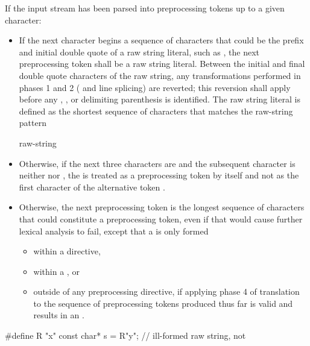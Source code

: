 \pnum
If the input stream has been parsed into preprocessing tokens up to a
given character:
\begin{itemize}
%
\item If the next character begins a sequence of characters that could be the prefix
and initial double quote of a raw string literal, such as , the next preprocessing
token shall be a raw string literal. Between the initial and final
double quote characters of the raw string, any transformations performed in phases
1 and 2 ( and line splicing) are reverted; this reversion
shall apply before any , , or delimiting
parenthesis is identified. The raw string literal is defined as the shortest sequence
of characters that matches the raw-string pattern

\begin{ncbnf}
  raw-string
\end{ncbnf}

\item Otherwise, if the next three characters are \tcode{<::} and the subsequent character
is neither \tcode{:} nor \tcode{>}, the \tcode{<} is treated as a preprocessing token by
itself and not as the first character of the alternative token \tcode{<:}.

\item Otherwise,
the next preprocessing token is the longest sequence of
characters that could constitute a preprocessing token, even if that
would cause further lexical analysis to fail,
except that a  is only formed
\begin{itemize}
\item
within a  directive,

\item
within a , or

\item
outside of any preprocessing directive,
if applying phase 4 of translation to the sequence
of preprocessing tokens produced thus far
is valid and
results in an .
\end{itemize}
\end{itemize}

\begin{example}
\begin{codeblock}
#define R "x"
const char* s = R"y";           // ill-formed raw string, not 
\end{codeblock}
\end{example}

